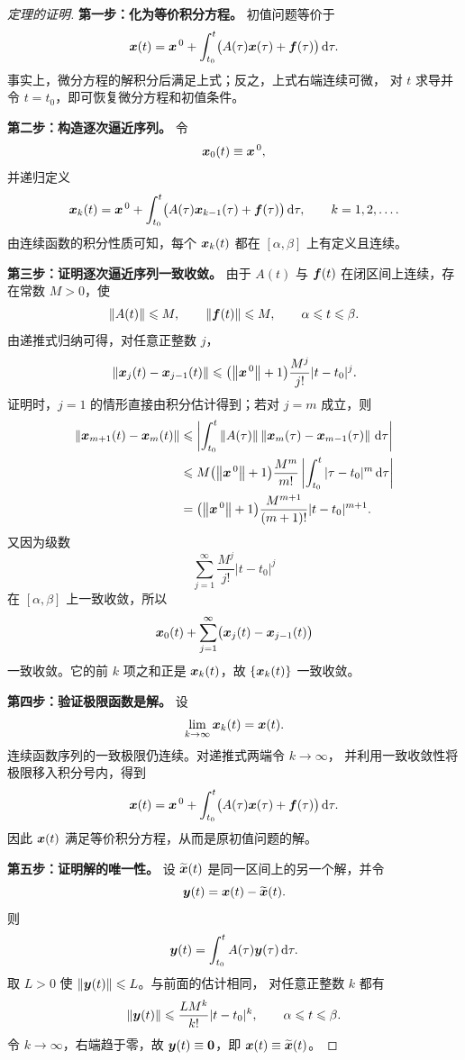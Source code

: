 \begin{proof}[定理的证明]
	\textbf{第一步：化为等价积分方程。}
	初值问题等价于
	\[
		\boldsymbol{x}(t)
		=\boldsymbol{x}^{\,0}
		+\int_{t_0}^{t}
		\bigl(A(\tau)\boldsymbol{x}(\tau)+\boldsymbol{f}(\tau)\bigr)\,\mathrm{d}\tau.
	\]
	事实上，微分方程的解积分后满足上式；反之，上式右端连续可微，
	对 $t$ 求导并令 $t=t_0$，即可恢复微分方程和初值条件。

	\textbf{第二步：构造逐次逼近序列。}
	令
	\[
		\boldsymbol{x}_0(t)\equiv\boldsymbol{x}^{\,0},
	\]
	并递归定义
	\[
		\boldsymbol{x}_k(t)
		=\boldsymbol{x}^{\,0}
		+\int_{t_0}^{t}
		\bigl(A(\tau)\boldsymbol{x}_{k-1}(\tau)
		+\boldsymbol{f}(\tau)\bigr)\,\mathrm{d}\tau,
		\qquad k=1,2,\ldots.
	\]
	由连续函数的积分性质可知，每个 $\boldsymbol{x}_k(t)$ 都在
	$[\alpha,\beta]$ 上有定义且连续。

	\textbf{第三步：证明逐次逼近序列一致收敛。}
	由于 $A(t)$ 与 $\boldsymbol{f}(t)$ 在闭区间上连续，存在常数 $M>0$，使
	\[
		\left\| A(t) \right\|\leqslant M,
		\qquad
		\left\| \boldsymbol{f}(t) \right\|\leqslant M,
		\qquad \alpha\leqslant t\leqslant\beta.
	\]
	由递推式归纳可得，对任意正整数 $j$，
	\[
		\left\| \boldsymbol{x}_j(t)-\boldsymbol{x}_{j-1}(t) \right\|
		\leqslant
		\bigl(\left\| \boldsymbol{x}^{\,0} \right\|+1\bigr)
		\dfrac{M^j}{j!}|t-t_0|^j.
	\]
	证明时，$j=1$ 的情形直接由积分估计得到；若对 $j=m$ 成立，则
	\[
		\begin{aligned}
		\left\| \boldsymbol{x}_{m+1}(t)-\boldsymbol{x}_m(t) \right\|
		&\leqslant
		\left|
		\int_{t_0}^{t}
		\left\| A(\tau) \right\|
		\left\| \boldsymbol{x}_m(\tau)-\boldsymbol{x}_{m-1}(\tau) \right\|
		\,\mathrm{d}\tau
		\right|\\
		&\leqslant
		M\bigl(\left\| \boldsymbol{x}^{\,0} \right\|+1\bigr)
		\dfrac{M^m}{m!}
		\left|
		\int_{t_0}^{t}|\tau-t_0|^m\,\mathrm{d}\tau
		\right|\\
		&=
		\bigl(\left\| \boldsymbol{x}^{\,0} \right\|+1\bigr)
		\dfrac{M^{m+1}}{(m+1)!}|t-t_0|^{m+1}.
		\end{aligned}
	\]
	又因为级数
	\[
		\sum_{j=1}^{\infty}\dfrac{M^j}{j!}|t-t_0|^j
	\]
	在 $[\alpha,\beta]$ 上一致收敛，所以
	\[
		\boldsymbol{x}_0(t)
		+\sum_{j=1}^{\infty}
		\bigl(\boldsymbol{x}_j(t)-\boldsymbol{x}_{j-1}(t)\bigr)
	\]
	一致收敛。它的前 $k$ 项之和正是 $\boldsymbol{x}_k(t)$，故
	$\{\boldsymbol{x}_k(t)\}$ 一致收敛。

	\textbf{第四步：验证极限函数是解。}
	设
	\[
		\lim_{k\to\infty}\boldsymbol{x}_k(t)=\boldsymbol{x}(t).
	\]
	连续函数序列的一致极限仍连续。对递推式两端令 $k\to\infty$，
	并利用一致收敛性将极限移入积分号内，得到
	\[
		\boldsymbol{x}(t)
		=\boldsymbol{x}^{\,0}
		+\int_{t_0}^{t}
		\bigl(A(\tau)\boldsymbol{x}(\tau)+\boldsymbol{f}(\tau)\bigr)\,\mathrm{d}\tau.
	\]
	因此 $\boldsymbol{x}(t)$ 满足等价积分方程，从而是原初值问题的解。

	\textbf{第五步：证明解的唯一性。}
	设 $\widetilde{\boldsymbol{x}}(t)$ 是同一区间上的另一个解，并令
	\[
		\boldsymbol{y}(t)=\boldsymbol{x}(t)-\widetilde{\boldsymbol{x}}(t).
	\]
	则
	\[
		\boldsymbol{y}(t)
		=\int_{t_0}^{t}A(\tau)\boldsymbol{y}(\tau)\,\mathrm{d}\tau.
	\]
	取 $L>0$ 使 $\left\| \boldsymbol{y}(t) \right\|\leqslant L$。与前面的估计相同，
	对任意正整数 $k$ 都有
	\[
		\left\| \boldsymbol{y}(t) \right\|
		\leqslant
		\dfrac{LM^k}{k!}|t-t_0|^k,
		\qquad \alpha\leqslant t\leqslant\beta.
	\]
	令 $k\to\infty$，右端趋于零，故
	$\boldsymbol{y}(t)\equiv\boldsymbol{0}$，即
	$\boldsymbol{x}(t)\equiv\widetilde{\boldsymbol{x}}(t)$。
\end{proof}

